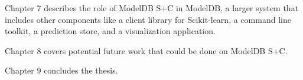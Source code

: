 Chapter 7 describes the role of ModelDB S+C in ModelDB,
a larger system that includes other components like a client library for Scikit-learn,
a command line toolkit, a prediction store, and a visualization application.

Chapter 8 covers potential future work that could be done on ModelDB S+C.

Chapter 9 concludes the thesis.
